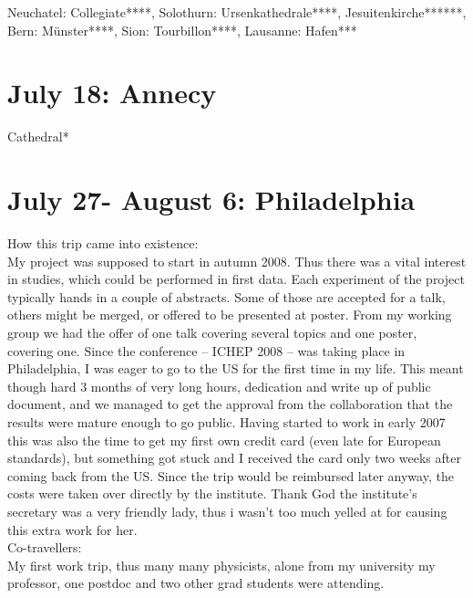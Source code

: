 Neuchatel: Collegiate****, Solothurn: Ursenkathedrale****, Jesuitenkirche******, Bern: M\"unster****, Sion: Tourbillon****, Lausanne: Hafen***

\section{July 18: Annecy}
\label{2008:Annecy}

Cathedral*

\section{July 27- August 6: Philadelphia}
\label{2008:Philadelphia}

How this trip came into existence:\\
My project was supposed to start in autumn 2008. Thus there was a vital interest in studies, which could be performed in first data. Each experiment of the project typically hands in a couple of abstracts. Some of those are accepted for a talk, others might be merged, or offered to be presented at poster. From my working group we had the offer of one talk covering several topics and one poster, covering one. Since the conference -- ICHEP 2008 -- was taking place in Philadelphia, I was eager to go to the US for the first time in my life. This meant though hard 3 months of very long hours, dedication and write up of public document, and we managed to get the approval from the collaboration that the results were mature enough to go public. Having started to work in early 2007 this was also the time to get my first own credit card (even late for European standards), but something got stuck and I received the card only two weeks after coming back from the US. Since the trip would be reimbursed later anyway, the costs were taken over directly by the institute. Thank God the institute's secretary was a very friendly lady, thus i wasn't too much yelled at for causing this extra work for her.\\

Co-travellers:\\
My first work trip, thus many many physicists, alone from my university my professor, one postdoc and two other grad students were attending.\\ 

